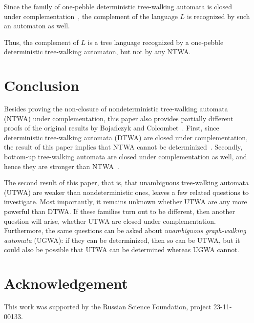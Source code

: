 \documentclass[12pt,a4paper]{article}
\theoremstyle{definition}
\begin{document}
Since the family of one-pebble deterministic tree-walking automata
is closed under complementation~\cite{MuschollSamuelidesSegoufin},
the complement of the language $L$ is recognized by such an automaton as well.

Thus, the complement of $L$ is a tree language
recognized by a one-pebble deterministic tree-walking automaton,
but not by any NTWA.





\section{Conclusion}

Besides proving the non-closure of nondeterministic tree-walking automata (NTWA)
under complementation,
this paper also provides partially different proofs
of the original results by Boja\'nczyk and Colcombet~\cite{BojanczykColcombet_det,BojanczykColcombet_reg}.
First, since deterministic tree-walking automata (DTWA) are closed under complementation,
the result of this paper implies that NTWA cannot be determinized~\cite{BojanczykColcombet_det}.
Secondly, bottom-up tree-walking automata are closed under complementation as well,
and hence they are stronger than NTWA~\cite{BojanczykColcombet_reg}.

The second result of this paper, that is,
that unambiguous tree-walking automata (UTWA) are weaker than nondeterministic ones,
leaves a few related questions to investigate.
Most importantly, it remains unknown whether UTWA
are any more powerful than DTWA.
If these families turn out to be different,
then another question will arise,
whether UTWA are closed under complementation.
Furthermore, the same questions can be asked about \emph{unambiguous graph-walking automata} (UGWA):
if they can be determinized, then so can be UTWA,
but it could also be possible that UTWA can be determined whereas UGWA cannot.




\section*{Acknowledgement}

This work was supported by the Russian Science Foundation, project 23-11-00133.
\end{document}
